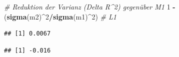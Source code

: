 \documentclass[
]{book}
\newenvironment{Shaded}{\begin{snugshade}}{\end{snugshade}}
\newcommand{\CommentTok}[1]{\textcolor[rgb]{0.56,0.35,0.01}{\textit{#1}}}
\newcommand{\DecValTok}[1]{\textcolor[rgb]{0.00,0.00,0.81}{#1}}
\newcommand{\KeywordTok}[1]{\textcolor[rgb]{0.13,0.29,0.53}{\textbf{#1}}}
\newcommand{\NormalTok}[1]{#1}
\newcommand{\OperatorTok}[1]{\textcolor[rgb]{0.81,0.36,0.00}{\textbf{#1}}}
\newcommand{\StringTok}[1]{\textcolor[rgb]{0.31,0.60,0.02}{#1}}
\begin{document}
\begin{Shaded}
\begin{Highlighting}[]
\CommentTok{# Reduktion der Varianz (Delta R^2) gegenüber M1}
\DecValTok{1} \OperatorTok{-}\StringTok{ }\NormalTok{(}\KeywordTok{sigma}\NormalTok{(m2)}\OperatorTok{^}\DecValTok{2}\OperatorTok{/}\KeywordTok{sigma}\NormalTok{(m1)}\OperatorTok{^}\DecValTok{2}\NormalTok{)  }\CommentTok{# L1}
\end{Highlighting}
\end{Shaded}

\begin{verbatim}
## [1] 0.0067
\end{verbatim}

\begin{Shaded}
\end{Shaded}

\begin{verbatim}
## [1] -0.016
\end{verbatim}
\end{document}

